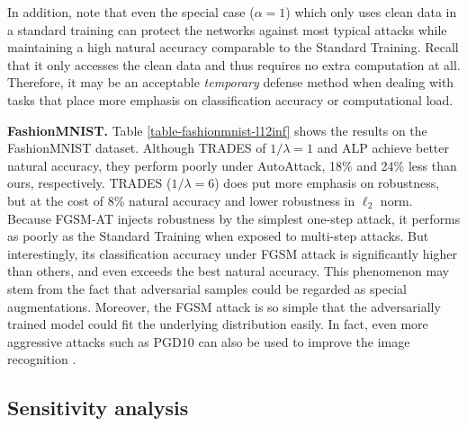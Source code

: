 \documentclass[preprint,review,12pt]{elsarticle}
\numberwithin{equation}{section}
\begin{document}
In addition, note that even the special case ($\alpha=1$) which only uses clean data in a standard training  can protect the networks against most typical attacks
while maintaining a  high natural accuracy comparable to the Standard Training.
Recall that it only accesses the clean data and thus requires no extra computation at all.
Therefore, it may be an acceptable \textit{temporary} defense method
when dealing with tasks that place more emphasis on classification accuracy or computational load.

\textbf{FashionMNIST.} Table \ref{table-fashionmnist-l12inf}  shows the results on the FashionMNIST dataset.
Although TRADES of $1/\lambda=1$ and ALP achieve  better natural accuracy,
they perform poorly under AutoAttack, 18\% and 24\% less than ours, respectively.
TRADES ($1/\lambda=6$) does put more emphasis on robustness,
but at the cost of 8\% natural accuracy and lower robustness in $\ell_2$ norm.
Because FGSM-AT injects robustness by the simplest one-step attack,
it performs as poorly as the Standard Training when exposed to multi-step attacks.
But interestingly, its classification accuracy under FGSM attack
is significantly higher than others, and even exceeds the best natural accuracy.
This phenomenon may stem from the fact that adversarial samples could be regarded as special augmentations.
Moreover, the FGSM attack is so simple that the adversarially trained model could fit the underlying distribution easily.
In fact, even more aggressive attacks such as PGD10 can also be used to improve the image recognition \cite{xie2020}.



\subsection{Sensitivity analysis}
\end{document}
